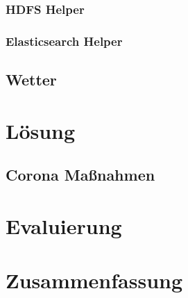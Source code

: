 \documentclass[12pt,oneside,a4paper,parskip]{scrbook}
\begin{document}
\subsection{HDFS Helper}
\subsection{Elasticsearch Helper}
\section{Wetter}

\chapter{Lösung}
\section{Corona Maßnahmen}


\chapter{Evaluierung}

\chapter{Zusammenfassung}


\backmatter

\listoffigures
{}

\listoftables


\cleardoublepage
{}
{}
\printbibliography

\end{document}
